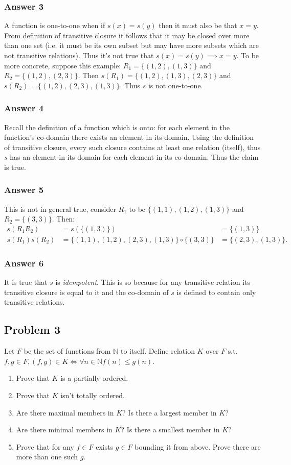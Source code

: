 \documentclass[11pt]{article}
\begin{document}
\subsubsection{Answer 3}
\label{sec-1-2-1}
A function is one-to-one when if $s(x)=s(y)$ then it must also be that
$x=y$.  From definition of transitive closure it follows that it may be
closed over more than one set (i.e. it must be its own subset but may have
more subsets which are not transitive relations).  Thus it's not true that
$s(x) = s(y) \implies x=y$. To be more concrete, suppose this example:
$R_1=\{(1, 2), (1, 3)\}$ and $R_2=\{(1, 2), (2, 3)\}$.
Then $s(R_1)=\{(1, 2), (1, 3), (2, 3)\}$ and $s(R_2)=\{(1, 2), (2, 3), (1, 3)\}$.
Thus $s$ is not one-to-one.
\subsubsection{Answer 4}
\label{sec-1-2-2}
Recall the definition of a function which is onto: for each element in the
function's co-domain there exists an element in its domain.  Using the
definition of transitive closure, every such closure contains at least one
relation (itself), thus $s$ has an element in its domain for each element in
its co-domain.  Thus the claim is true.
\subsubsection{Answer 5}
\label{sec-1-2-3}
This is not in general true, consider $R_1$ to be $\{(1,1), (1,2), (1,3)\}$
and $R_2=\{(3,3)\}$.  Then:
\begin{eqnarray*}
  s(R_1R_2)    &= s(\{(1,3)\})                                   &= \{(1,3)\} \\
  s(R_1)s(R_2) &= \{(1,1), (1,2), (2,3), (1,3)\} \circ \{(3,3)\} &= \{(2,3), (1,3)\}.
\end{eqnarray*}
\subsubsection{Answer 6}
\label{sec-1-2-4}
It is true that $s$ is \emph{idempotent}. This is so because for any transitive
relation its transitive closure is equal to it and the co-domain of $s$ is
defined to contain only transitive relations.
\subsection{Problem 3}
\label{sec-1-3}
Let $F$ be the set of functions from $\mathbb{N}$ to itself.  Define relation
$K$ over $F$ s.t. $f, g \in F, (f, g) \in K \iff \forall n \in \mathbb{N} f(n) \leq g(n)$.
\begin{enumerate}
\item Prove that $K$ is a partially ordered.
\item Prove that $K$ isn't totally ordered.
\item Are there maximal members in $K$? Is there a largest member in $K$?
\item Are there minimal members in $K$? Is there a smallest member in $K$?
\item Prove that for any $f \in F$ exists $g \in F$ bounding it from above.
Prove there are more than one such $g$.
\end{enumerate}
\end{document}
